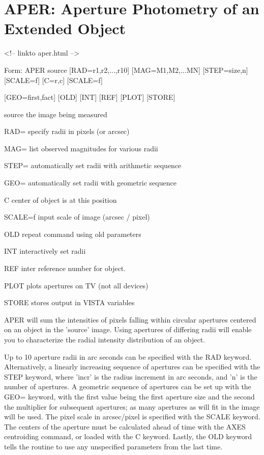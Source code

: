 \section{APER: Aperture Photometry of an Extended Object}
\begin{rawhtml}
<!-- linkto aper.html -->
\end{rawhtml}
\begin{command}
  \item[Form: APER source {[RAD=r1,r2,...,r10]} {[MAG=M1,M2,...MN]} 
       {[STEP=size,n]} {[SCALE=f]} {[C=r,c]} {[SCALE=f]}\hfill]{}
  \item{{[GEO=first,fact]} {[OLD]} {[INT]} {[REF]} {[PLOT]} {[STORE]}}
  \item[source]{the image being measured}
  \item[RAD=]{specify radii in pixels (or arcsec)}
  \item[MAG=]{list observed magnitudes for various radii}
  \item[STEP=]{automatically set radii with arithmetic sequence}
  \item[GEO=]{automatically set radii with geometric sequence}
  \item[C]{center of object is at this position}
  \item[SCALE=f]{input scale of image (arcsec / pixel)}
  \item[OLD]{repeat command using old parameters}
  \item[INT]{interactively set radii}
  \item[REF]{inter reference number for object.}
  \item[PLOT]{plots apertures on TV (not all devices)}
  \item[STORE]{stores output in VISTA variables}
\end{command}

APER will sum the intensities of pixels falling within circular apertures
centered on an object in the 'source' image.  Using apertures of differing
radii will enable you to characterize the radial intensity distribution of
an object.

Up to 10 aperture radii in arc seconds can be specified with the RAD
keyword. Alternatively, a linearly increasing sequence of apertures can be
specified with the STEP keyword, where 'incr' is the radius increment in
arc seconds, and 'n' is the number of apertures.  A geometric sequence of
apertures can be set up with the GEO= keyword, with the first value being
the first aperture size and the second the multiplier for subsequent
apertures; as many apertures as will fit in the image will be used.  The
pixel scale in arcsec/pixel is specified with the SCALE keyword.  The
centers of the aperture must be calculated ahead of time with the AXES
centroiding command, or loaded with the C keyword. Lastly, the OLD keyword
tells the routine to use any unspecified parameters from the last time.

